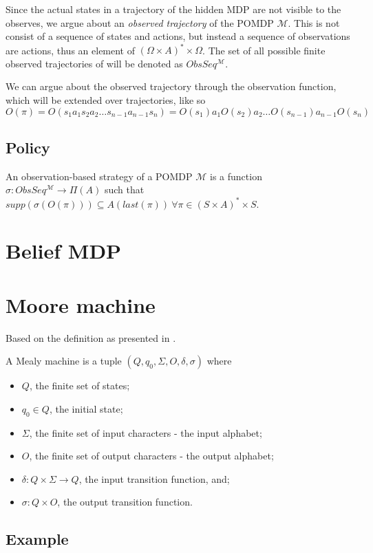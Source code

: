 Since the actual states in a trajectory of the hidden MDP are not visible to the observes, we argue about an \textit{observed trajectory} of the POMDP $\mathcal{M}$. This is not consist of a sequence of states and actions, but instead a sequence of observations are actions, thus an element of $(\Omega\times A)^*\times \Omega$. The set of all possible finite observed trajectories of will be denoted as $ObsSeq^{\mathcal{M}}$.

We can argue about the observed trajectory through the observation function, which will be extended over trajectories, like so
\[O(\pi)=O(s_1 a_1 s_2 a_2\dots s_{n-1} a_{n-1} s_n) = O(s_1) a_1 O(s_2) a_2\dots O(s_{n-1}) a_{n-1} O(s_n)\]

\subsection*{Policy}
\begin{definition}
	An observation-based strategy of a POMDP $\mathcal{M}$ is a function $\sigma:ObsSeq^{\mathcal{M}}\to\Pi(A)$ such that $supp(\sigma(O(\pi)))\subseteq A (last(\pi))\ \forall \pi\in(S\times A)^*\times S$.
\end{definition}

\section{Belief MDP}



\section{Moore machine}
Based on the definition as presented in \cite{p:moore}.
\begin{definition}
	A Mealy machine is a tuple $(Q,q_0,\Sigma,O,\delta,\sigma)$ where
	\begin{itemize}
		\item $Q$, the finite set of states;
		\item $q_0\in Q$, the initial state;
		\item $\Sigma$, the finite set of input characters - the input alphabet;
		\item $O$, the finite set of output characters - the output alphabet;
		\item $\delta: Q\times \Sigma\to Q$, the input transition function, and;
		\item $\sigma : Q\times O$, the output transition function.
	\end{itemize}
\end{definition}
\subsection*{Example}
